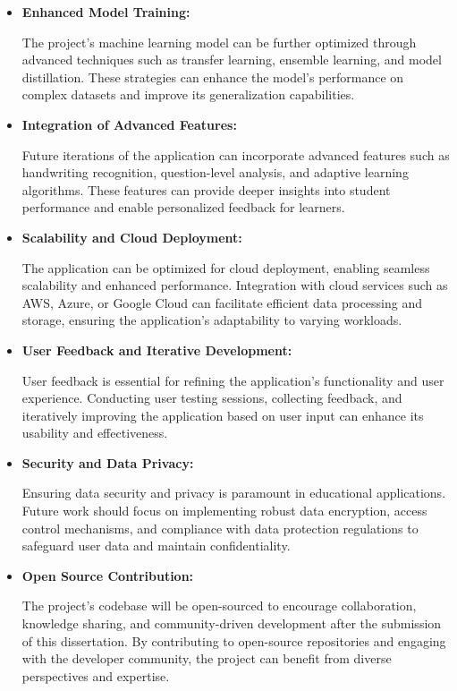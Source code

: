 \documentclass[twocolumn]{article}
\begin{document}
\begin{itemize}
    \item \textbf{Enhanced Model Training:} 
    
    The project's machine learning model can be further optimized through advanced techniques such as transfer learning, ensemble learning, and model distillation. These strategies can enhance the model's performance on complex datasets and improve its generalization capabilities.

    \item \textbf{Integration of Advanced Features:} 
    
    Future iterations of the application can incorporate advanced features such as handwriting recognition, question-level analysis, and adaptive learning algorithms. These features can provide deeper insights into student performance and enable personalized feedback for learners.

    \item \textbf{Scalability and Cloud Deployment:} 
    
    The application can be optimized for cloud deployment, enabling seamless scalability and enhanced performance. Integration with cloud services such as AWS, Azure, or Google Cloud can facilitate efficient data processing and storage, ensuring the application's adaptability to varying workloads.

    \item \textbf{User Feedback and Iterative Development:} 
    
    User feedback is essential for refining the application's functionality and user experience. Conducting user testing sessions, collecting feedback, and iteratively improving the application based on user input can enhance its usability and effectiveness.

    \item \textbf{Security and Data Privacy:} 
    
    Ensuring data security and privacy is paramount in educational applications. Future work should focus on implementing robust data encryption, access control mechanisms, and compliance with data protection regulations to safeguard user data and maintain confidentiality.

    \item \textbf{Open Source Contribution:}
    
    The project's codebase will be open-sourced to encourage collaboration, knowledge sharing, and community-driven development after the submission of this dissertation. By contributing to open-source repositories and engaging with the developer community, the project can benefit from diverse perspectives and expertise.
\end{itemize}
\end{document}
